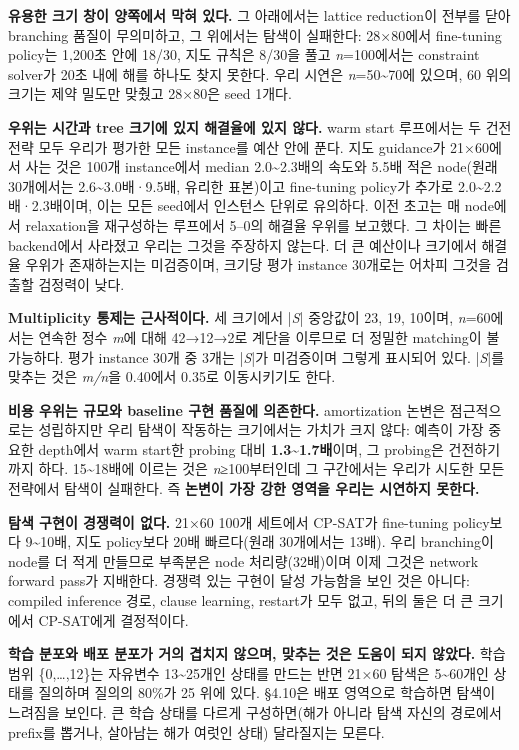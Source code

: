 \documentclass[final,5p,twocolumn]{elsarticle}
\begin{document}
\textbf{유용한 크기 창이 양쪽에서 막혀 있다.} 그 아래에서는 lattice reduction이 전부를 닫아 branching 품질이 무의미하고, 그 위에서는 탐색이 실패한다: 28×80에서 fine-tuning policy는 1,200초 안에 18/30, 지도 규칙은 8/30을 풀고 \textit{n}=100에서는 constraint solver가 20초 내에 해를 하나도 찾지 못한다. 우리 시연은 \textit{n}=50\textasciitilde{}70에 있으며, 60 위의 크기는 제약 밀도만 맞췄고 28×80은 seed 1개다.

\textbf{우위는 시간과 tree 크기에 있지 해결율에 있지 않다.} warm start 루프에서는 두 건전 전략 모두 우리가 평가한 모든 instance를 예산 안에 푼다. 지도 guidance가 21×60에서 사는 것은 100개 instance에서 median 2.0\textasciitilde{}2.3배의 속도와 5.5배 적은 node(원래 30개에서는 2.6\textasciitilde{}3.0배·9.5배, 유리한 표본)이고 fine-tuning policy가 추가로 2.0\textasciitilde{}2.2배·2.3배이며, 이는 모든 seed에서 인스턴스 단위로 유의하다. 이전 초고는 매 node에서 relaxation을 재구성하는 루프에서 5–0의 해결율 우위를 보고했다. 그 차이는 빠른 backend에서 사라졌고 우리는 그것을 주장하지 않는다. 더 큰 예산이나 크기에서 해결율 우위가 존재하는지는 미검증이며, 크기당 평가 instance 30개로는 어차피 그것을 검출할 검정력이 낮다.

\textbf{Multiplicity 통제는 근사적이다.} 세 크기에서 |\textit{S}| 중앙값이 23, 19, 10이며, \textit{n}=60에서는 연속한 정수 \textit{m}에 대해 42→12→2로 계단을 이루므로 더 정밀한 matching이 불가능하다. 평가 instance 30개 중 3개는 |\textit{S}|가 미검증이며 그렇게 표시되어 있다. |\textit{S}|를 맞추는 것은 \textit{m/n}을 0.40에서 0.35로 이동시키기도 한다.

\textbf{비용 우위는 규모와 baseline 구현 품질에 의존한다.} amortization 논변은 점근적으로는 성립하지만 우리 탐색이 작동하는 크기에서는 가치가 크지 않다: 예측이 가장 중요한 depth에서 warm start한 probing 대비 \textbf{1.3\textasciitilde{}1.7배}이며, 그 probing은 건전하기까지 하다. 15\textasciitilde{}18배에 이르는 것은 \textit{n}≥100부터인데 그 구간에서는 우리가 시도한 모든 전략에서 탐색이 실패한다. 즉 \textbf{논변이 가장 강한 영역을 우리는 시연하지 못한다.}

\textbf{탐색 구현이 경쟁력이 없다.} 21×60 100개 세트에서 CP-SAT가 fine-tuning policy보다 9\textasciitilde{}10배, 지도 policy보다 20배 빠르다(원래 30개에서는 13배). 우리 branching이 node를 더 적게 만들므로 부족분은 node 처리량(32배)이며 이제 그것은 network forward pass가 지배한다. 경쟁력 있는 구현이 달성 가능함을 보인 것은 아니다: compiled inference 경로, clause learning, restart가 모두 없고, 뒤의 둘은 더 큰 크기에서 CP-SAT에게 결정적이다.

\textbf{학습 분포와 배포 분포가 거의 겹치지 않으며, 맞추는 것은 도움이 되지 않았다.} 학습 범위 \{0,…,12\}는 자유변수 13\textasciitilde{}25개인 상태를 만드는 반면 21×60 탐색은 5\textasciitilde{}60개인 상태를 질의하며 질의의 80\%가 25 위에 있다. §4.10은 배포 영역으로 학습하면 탐색이 느려짐을 보인다. 큰 학습 상태를 다르게 구성하면(해가 아니라 탐색 자신의 경로에서 prefix를 뽑거나, 살아남는 해가 여럿인 상태) 달라질지는 모른다.
\end{document}
